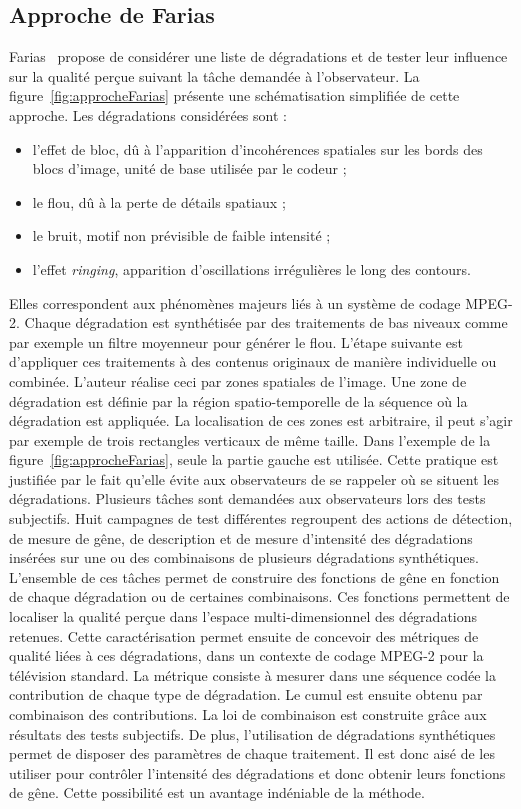 \subsection{Approche de Farias}
Farias~\cite{farias-phd} propose de considérer une liste de dégradations et de tester leur influence sur la qualité perçue suivant la tâche demandée à l'observateur. La figure~\ref{fig:approcheFarias} présente une schématisation simplifiée de cette approche. Les dégradations considérées sont :
\begin{itemize}
\item l'effet de bloc, dû à l'apparition d'incohérences spatiales sur les bords des blocs d'image, unité de base utilisée par le codeur ;
\item le flou, dû à la perte de détails spatiaux ;
\item le bruit, motif non prévisible de faible intensité ;
\item l'effet \emph{ringing}, apparition d'oscillations irrégulières le long des contours.
\end{itemize}

Elles correspondent aux phénomènes majeurs liés à un système de codage MPEG-2. Chaque dégradation est synthétisée par des traitements de bas niveaux comme par exemple un filtre moyenneur pour générer le flou. L'étape suivante est d'appliquer ces traitements à des contenus originaux de manière individuelle ou combinée. L'auteur réalise ceci par zones spatiales de l'image. Une zone de dégradation est définie par la région spatio-temporelle de la séquence où la dégradation est appliquée. La localisation de ces zones est arbitraire, il peut s'agir par exemple de trois rectangles verticaux de même taille. Dans l'exemple de la figure~\ref{fig:approcheFarias}, seule la partie gauche est utilisée. Cette pratique est justifiée par le fait qu'elle évite aux observateurs de se rappeler où se situent les dégradations. Plusieurs tâches sont demandées aux observateurs lors des tests subjectifs. Huit campagnes de test différentes regroupent des actions de détection, de mesure de gêne, de description et de mesure d'intensité des dégradations insérées sur une ou des combinaisons de plusieurs dégradations synthétiques. L'ensemble de ces tâches permet de construire des fonctions de gêne en fonction de chaque dégradation ou de certaines combinaisons. Ces fonctions permettent de localiser la qualité perçue dans l'espace multi-dimensionnel des dégradations retenues. Cette caractérisation permet ensuite de concevoir des métriques de qualité liées à ces dégradations, dans un contexte de codage MPEG-2 pour la télévision standard. La métrique consiste à mesurer dans une séquence codée la contribution de chaque type de dégradation. Le cumul est ensuite obtenu par combinaison des contributions. La loi de combinaison est construite grâce aux résultats des tests subjectifs. De plus, l'utilisation de dégradations synthétiques permet de disposer des paramètres de chaque traitement. Il est donc aisé de les utiliser pour contrôler l'intensité des dégradations et donc obtenir leurs fonctions de gêne. Cette possibilité est un avantage indéniable de la méthode.

